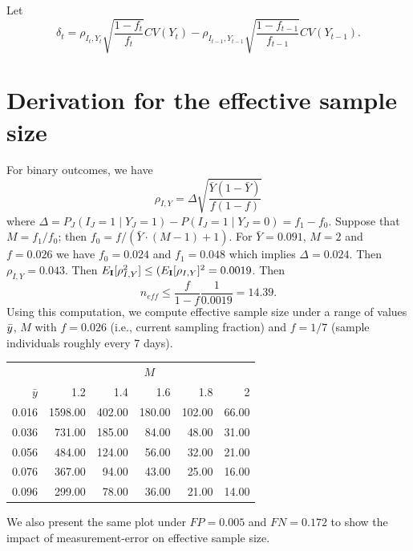 \documentclass[aoas]{amsart}
\def\I{\bf I}
\begin{document}
Let
$$
\delta_{t} = \rho_{I_t,Y_t} \sqrt{\frac{1-f_t}{f_t}} CV (Y_t)  -\rho_{I_{t-1},Y_{t-1}} \sqrt{\frac{1-f_{t-1}}{f_{t-1}}} CV (Y_{t-1}).
$$



\section{Derivation for the effective sample size}
\label{section:effss}

For binary outcomes, we have
\begin{equation} \label{eq:binaryrho}
\rho_{I,Y} = \Delta \sqrt{\frac{\bar Y (1 - \bar Y)}{f (1-f)} }
\end{equation}
where $\Delta = P_J (I_J = 1 \mid Y_J = 1) - P(I_J = 1 \mid Y_J = 0) = f_1 - f_0$.  Suppose that $M = f_1/f_0$; then
$f_0 = f / (\bar Y \cdot (M-1) + 1)$.  For $\bar Y = 0.091$, $M = 2$ and $f = 0.026$ we have $f_0 = 0.024$ and $f_1 = 0.048$ which implies $\Delta = 0.024$.
Then $\rho_{I,Y} = 0.043$.  Then $E_{\I} [ \rho_{I,Y}^2 ] \leq (E_{\I} [\rho_{I,Y} ]^2 = 0.0019$.  Then
$$
n_{eff} \leq \frac{f}{1-f} \frac{1}{0.0019} = 14.39.
$$
Using this computation, we compute effective sample size under a range of values $\bar{y}$, $M$ with $f = 0.026$ (i.e., current sampling fraction) and $f =1/7$ (sample individuals roughly every 7 days).

\begin{table}[ht]
\centering
\begin{tabular}{rrrrrr}
& \multicolumn{5}{c}{$M$} \\ \cline{2-6}
$\bar y$ & 1.2 & 1.4 & 1.6 & 1.8 & 2 \\
  \hline
0.016 & 1598.00 & 402.00 & 180.00 & 102.00 & 66.00 \\
  0.036 & 731.00 & 185.00 & 84.00 & 48.00 & 31.00 \\
  0.056 & 484.00 & 124.00 & 56.00 & 32.00 & 21.00 \\
  0.076 & 367.00 & 94.00 & 43.00 & 25.00 & 16.00 \\
  0.096 & 299.00 & 78.00 & 36.00 & 21.00 & 14.00 \\
   \hline
\end{tabular}
\end{table}


We also present the same plot under $FP = 0.005$ and $FN = 0.172$ to show the impact of measurement-error on effective sample size.
\end{document}
